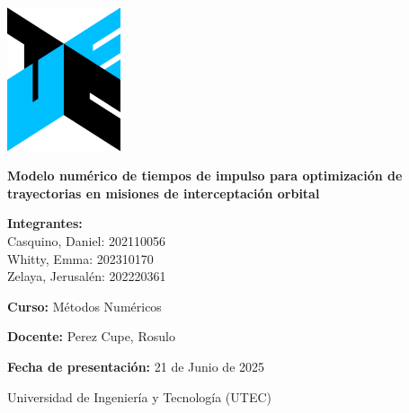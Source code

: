 \begin{titlepage}
    \pagestyle{empty}
    \begin{center}
        \includegraphics[width=0.25\textwidth]{isologo-utec.png} %
        \vspace{1cm}

        {\LARGE\textbf{Modelo numérico de tiempos de impulso para optimización de trayectorias en misiones de interceptación orbital}}
        \vspace{1.5cm}

        {\large
            \textbf{Integrantes:} \\
            Casquino, Daniel: 202110056 \\
            Whitty, Emma: 202310170 \\ Zelaya, Jerusalén: 202220361 \\ } \vspace{1cm}

        {\large
            \textbf{Curso:} Métodos Numéricos
        }
        \vspace{0.5cm}

        {\large
            \textbf{Docente:} Perez Cupe, Rosulo
        }
        \vspace{0.5cm}

        {\large
            \textbf{Fecha de presentación:} 21 de Junio de 2025
        }
        \vfill

        {\large
            Universidad de Ingeniería y Tecnología (UTEC)
        }
    \end{center}
\end{titlepage}